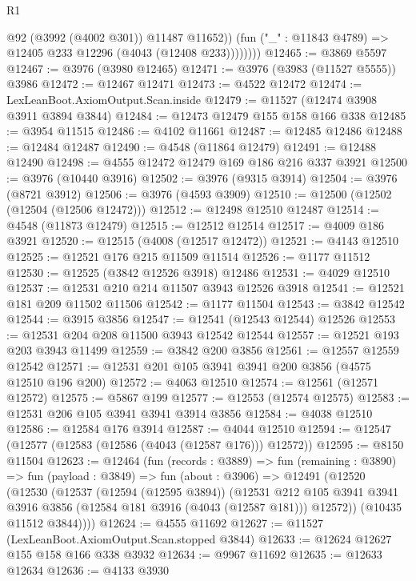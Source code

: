\begin{lexlean}{R1}
\begin{coremodule}
                  @92
                  (@3992 (@4002 @301))
                  @11487
                  @11652))
              (fun ("_" : @11843 @4789) => @12405 @233 @12296 (@4043 (@12408 @233))))))))
@12465 := @3869 @5597
@12467 := @3976 (@3980 @12465)
@12471 := @3976 (@3983 (@11527 @5555)) @3986
@12472 := @12467 @12471
@12473 := @4522 @12472
@12474 := LexLeanBoot.AxiomOutput.Scan.inside
@12479 := @11527 (@12474 @3908 @3911 @3894 @3844)
@12484 := @12473 @12479 @155 @158 @166 @338
@12485 := @3954 @11515
@12486 := @4102 @11661
@12487 := @12485 @12486
@12488 := @12484 @12487
@12490 := @4548 (@11864 @12479)
@12491 := @12488 @12490
@12498 := @4555 @12472 @12479 @169 @186 @216 @337 @3921
@12500 := @3976 (@10440 @3916)
@12502 := @3976 (@9315 @3914)
@12504 := @3976 (@8721 @3912)
@12506 := @3976 (@4593 @3909)
@12510 := @12500 (@12502 (@12504 (@12506 @12472)))
@12512 := @12498 @12510 @12487
@12514 := @4548 (@11873 @12479)
@12515 := @12512 @12514
@12517 := @4009 @186 @3921
@12520 := @12515 (@4008 (@12517 @12472))
@12521 := @4143 @12510
@12525 := @12521 @176 @215 @11509 @11514
@12526 := @1177 @11512
@12530 := @12525 (@3842 @12526 @3918) @12486
@12531 := @4029 @12510
@12537 := @12531 @210 @214 @11507 @3943 @12526 @3918
@12541 := @12521 @181 @209 @11502 @11506
@12542 := @1177 @11504
@12543 := @3842 @12542
@12544 := @3915 @3856
@12547 := @12541 (@12543 @12544) @12526
@12553 := @12531 @204 @208 @11500 @3943 @12542 @12544
@12557 := @12521 @193 @203 @3943 @11499
@12559 := @3842 @200 @3856
@12561 := @12557 @12559 @12542
@12571 := @12531 @201 @105 @3941 @3941 @200 @3856 (@4575 @12510 @196 @200)
@12572 := @4063 @12510
@12574 := @12561 (@12571 @12572)
@12575 := @5867 @199
@12577 := @12553 (@12574 @12575)
@12583 := @12531 @206 @105 @3941 @3941 @3914 @3856
@12584 := @4038 @12510
@12586 := @12584 @176 @3914
@12587 := @4044 @12510
@12594 := @12547 (@12577 (@12583 (@12586 (@4043 (@12587 @176))) @12572))
@12595 := @8150 @11504
@12623 := @12464
    (fun (records : @3889) =>
    fun (remaining : @3890) =>
    fun (payload : @3849) =>
    fun (about : @3906) =>
    @12491
      (@12520
        (@12530
          (@12537
            (@12594 (@12595 @3894))
            (@12531
              @212
              @105
              @3941
              @3941
              @3916
              @3856
              (@12584 @181 @3916 (@4043 (@12587 @181)))
              @12572))
          (@10435 @11512 @3844))))
@12624 := @4555 @11692
@12627 := @11527 (LexLeanBoot.AxiomOutput.Scan.stopped @3844)
@12633 := @12624 @12627 @155 @158 @166 @338 @3932
@12634 := @9967 @11692
@12635 := @12633 @12634
@12636 := @4133 @3930

\end{coremodule}
\end{lexlean}
